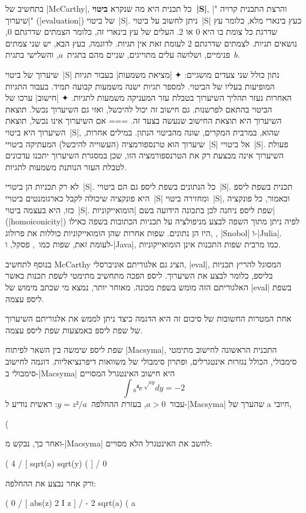בתחשיב של \E|McCarthy|, כל תכנית היא מה שנקרא \textbf{ביטוי~\E|S|}, והרצת
התכנית קרויה "\ע|שיערוך|" (\E|evaluation|) של ביטוי~\E|S|. ניתן לחשוב על
ביטוי~\E|S| כעץ בינארי מלא, כלומר עץ שדרגת כל צומת בו היא 0 או 2. העלים של עץ
בינארי זה, כלומר הצמתים שדרגתם 0, נושאים תגיות. לצמתים שדרגתם 2 לעומת זאת אין
תגיות. לדוגמה, בעץ הבא, יש שני צמתים פנימיים, ושלושה עלים מתוייגים, שניים מהם
בתגית~$a$, והשלישי בתגית~$b$.
\begin{quote}
  \center
\end{quote}

שיערוך של ביטוי~\E|S| נתון כולל שני צעדים מושגיים:
✦ \ע|מציאת משמעות| בעבור תגיות המופיעות בעליו של הביטוי. למספר תגיות ישנה
משמעות קבועה תמיד. בעבור התגיות האחרות נעזר תהליך השיערוך בטבלת עזר המעניקה
משמעות לתגיות.
✦ \ע|חישוב| ערכו של הביטוי בהתאם לפרשנות. גם חישוב זה יכול להיכשל, ואזי גם
השיערוך נכשל. תוצאת השיערוך היא תוצאת החישוב שנעשה בצעד זה.
===
אם השיערוך אינו נכשל, תוצאת השיערוך היא ביטוי~\E|S|, שהוא, במרבית המקרים, שונה
מהביטוי הנתון. במילים אחרות, שיערוך הוא טרנספורמציה (העשוייה להיכשל) המעתיקה
ביטויי~\E|S| אל ביטויי~\E|S|. פעולת השיערוך אינה מבצעת רק את הטרנספורמציה הזו,
שכן במסגרת השיערוך יתכנו עדכונים לטבלת העזר הנותנת משמעות לתגיות.

לא רק תכניות הן ביטויי~\E|S|. כל הנתונים בשפת ליספ גם הם ביטויי~\E|S|. תכנית
בשפת ליספ היא פונקציה שיכולה לקבל כארגומנטים ביטויי~\E|S| ומחזירה ביטוי~\E|S|,
וכאמור, כל פונקציה כזו, היא בעצמה ביטוי~\E|S|. שפת ליספ ניחנה לכן בתכונה הידועה
בשם \ע|הומואייקוניות| (\E|homoiconicity|) לפיה ניתן מתוך השפה לבצע מניפולציה על
תכניות הכתובות בשפה כאילו היו הן נתונים. שפות אחרות שהן הומואייקוניות כוללות את
פרולוג, , \E|Snobol| ו-\E|Julia|. לעומת זאת, שפות
כמו~\CPL, פסקל, ו-\E|Java|, כמו מרבית שפות התכנות אינן הומואייקוניות.

בנוסף לתחשיב McCarthy הציג גם אלגוריתם אוניברסלי, \E|eval|, המסוגל להריץ תכניות
בליספ, כלומר לבצע את השיערוך. ליספ הפכה מתחשיב מתימטי לשפת תכנות כאשר האלגוריתם
הזה מומש בשפת מכונה. מאוחר יותר, נמצא מי שכתב מימוש של \E|eval| בשפת ליספ עצמה.

אחת המטרות החשובות של סיכום זה היא הדגמה כיצד ניתן לממש את אלגוריתם השיערוך של
שפת ליספ באמצעות שפת ליספ עצמה.

שפת ליספ שימשה בין השאר לפיתוח \E|Macsyma|, התכנית הראשונה לחישוב מתימטי
סימבולי, הכולל נגזרות אינטגרלים, ופתרון סימבולי של משוואות דיפרנציאליות. דוגמה
לחישוב סימבולי ב-\E|Macsyma| היא חישוב האינטגרל המסויים \[
  ∫₀⁴ e^{√{ay}}dy=-2
\] עבור~$a>0$, בעזרת ההחלפה~$y=z²/a$:
ראשית נודיע ל-\E|Macsyma| שהערך של a חיובי,
\begin{LISP}
(%
\end{LISP}
ואחר כך, נבקש מ-\E|Macsyma| לחשב את האינטגרל הלא מסויים:
\begin{LISP}
(%
 4
 /
 [ sqrt(a) sqrt(y) (%
 ]
 /
 0
\end{LISP}
ורק אחר נבצע את ההחלפה:
\begin{LISP}
(%
 0
 /
 [ abs(z)
 2 I z %
 ]
 /
- 2 sqrt(a)
(%
 a
\end{LISP}


